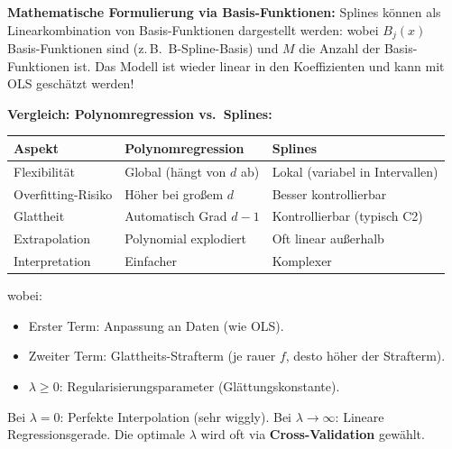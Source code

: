 \textbf{Mathematische Formulierung via Basis-Funktionen:} Splines können als Linearkombination von Basis-Funktionen dargestellt werden:
wobei $B_j(x)$ Basis-Funktionen sind (z.\,B.\ B-Spline-Basis) und $M$ die Anzahl der Basis-Funktionen ist. Das Modell ist wieder linear in den Koeffizienten und kann mit OLS geschätzt werden!

\textbf{Vergleich: Polynomregression vs.\ Splines:}
\begin{table}[h]
    \centering
    \small
    \begin{tabular}{|l|l|l|}
        \hline
        \textbf{Aspekt}    & \textbf{Polynomregression} & \textbf{Splines}                \\
        \hline
        Flexibilität       & Global (hängt von $d$ ab)  & Lokal (variabel in Intervallen) \\
        \hline
        Overfitting-Risiko & Höher bei großem $d$       & Besser kontrollierbar           \\
        \hline
        Glattheit          & Automatisch Grad $d-1$     & Kontrollierbar (typisch C2)     \\
        \hline
        Extrapolation      & Polynomial explodiert      & Oft linear außerhalb            \\
        \hline
        Interpretation     & Einfacher                  & Komplexer                       \\
        \hline
    \end{tabular}
\end{table}

wobei:
\begin{itemize}[leftmargin=1.5em]
    \item Erster Term: Anpassung an Daten (wie OLS).
    \item Zweiter Term: Glattheits-Strafterm (je rauer $f$, desto höher der Strafterm).
    \item $\lambda \geq 0$: Regularisierungsparameter (Glättungskonstante).
\end{itemize}
Bei $\lambda = 0$: Perfekte Interpolation (sehr wiggly). Bei $\lambda \to \infty$: Lineare Regressionsgerade. Die optimale $\lambda$ wird oft via \textbf{Cross-Validation} gewählt.

